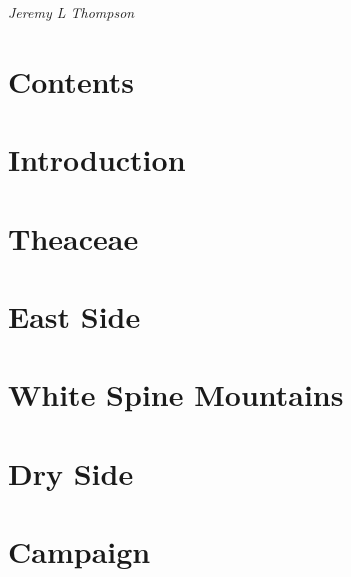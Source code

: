 \documentclass[twoside, openany]{book}
\begin{document}
\begin{titlepage}
\centering

~\\
\vspace{5cm}
\\
\vspace{2cm}
{\Large\itshape Jeremy L Thompson}

\end{titlepage}
\thispagestyle{empty}

\chapter*{Contents}

\begin{multicols}{2}
\makeatletter
\large{
}
\makeatother
\end{multicols}

\chapter*{Introduction}



\chapter{Theaceae}



\chapter{East Side}



\chapter{White Spine Mountains}



\chapter{Dry Side}



\chapter{Campaign}


\end{document}
